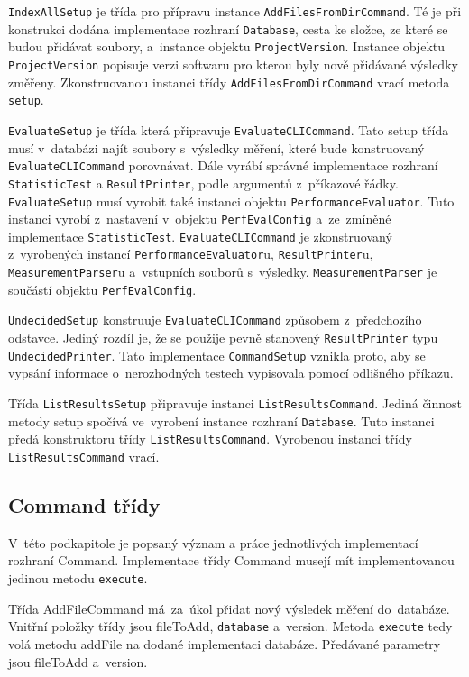 \lstinline{IndexAllSetup} je třída pro přípravu instance \lstinline{AddFilesFromDirCommand}. Té je při konstrukci dodána
implementace rozhraní \lstinline{Database}, cesta ke složce, ze které se budou přidávat soubory,
a~instance objektu \lstinline{ProjectVersion}. Instance objektu \lstinline{ProjectVersion} popisuje verzi softwaru pro kterou
byly nově přidávané výsledky změřeny. Zkonstruovanou instanci třídy \lstinline{AddFilesFromDirCommand} vrací metoda \lstinline{setup}.

\lstinline{EvaluateSetup} je třída která připravuje \lstinline{EvaluateCLICommand}. Tato setup třída musí v~databázi najít
soubory s~výsledky měření, které bude konstruovaný \lstinline{EvaluateCLICommand} porovnávat. Dále vyrábí správné
implementace rozhraní \lstinline{StatisticTest} a \lstinline{ResultPrinter}, podle argumentů z~příkazové řádky.
\lstinline{EvaluateSetup} musí vyrobit také instanci objektu \lstinline{PerformanceEvaluator}. Tuto instanci vyrobí
z~nastavení v~objektu \lstinline{PerfEvalConfig} a~ze~zmíněné implementace \lstinline{StatisticTest}. \lstinline{EvaluateCLICommand} je zkonstruovaný
z~vyrobených instancí \lstinline{PerformanceEvaluator}u, \lstinline{ResultPrinter}u, \lstinline{MeasurementParser}u a~vstupních souborů s~výsledky.
\lstinline{MeasurementParser} je součástí objektu \lstinline{PerfEvalConfig}.

\lstinline{UndecidedSetup} konstruuje \lstinline{EvaluateCLICommand} způsobem z~předchozího odstavce.
Jediný rozdíl je, že se použije pevně stanovený \lstinline{ResultPrinter} typu \lstinline{UndecidedPrinter}.
Tato implementace \lstinline{CommandSetup} vznikla proto, aby se vypsání informace o~nerozhodných
testech vypisovala pomocí odlišného příkazu.

Třída \lstinline{ListResultsSetup} připravuje instanci \lstinline{ListResultsCommand}. Jediná činnost metody setup
spočívá ve~vyrobení instance rozhraní \lstinline{Database}. Tuto instanci předá konstruktoru
třídy \lstinline{ListResultsCommand}. Vyrobenou instanci třídy \lstinline{ListResultsCommand} vrací.

\subsection{Command třídy}

V~této podkapitole je popsaný význam a práce jednotlivých implementací rozhraní Command.
Implementace třídy Command musejí mít implementovanou jedinou metodu \lstinline{execute}.

Třída AddFileCommand má~za~úkol přidat nový výsledek měření do~databáze. Vnitřní položky
třídy jsou fileToAdd, \lstinline{database} a~version. Metoda \lstinline{execute} tedy volá metodu addFile na dodané implementaci
databáze. Předávané parametry jsou fileToAdd a~version.

